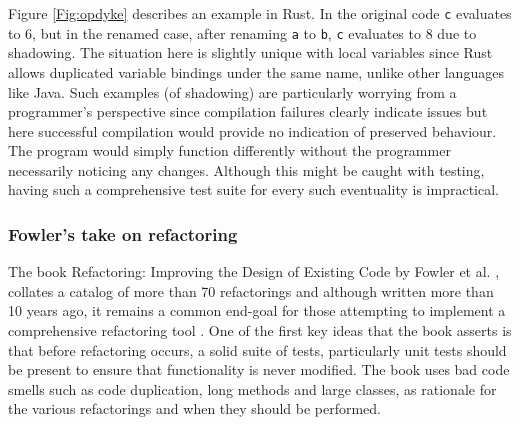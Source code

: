 \label{fig:listings}

Figure \ref{Fig:opdyke} describes an example in Rust. In the original code {\verb|c|} evaluates to 6, but in the renamed case, after renaming {\verb|a|} to {\verb|b|}, {\verb|c|} evaluates to 8 due to shadowing. The situation here is slightly unique with local variables since Rust allows duplicated variable bindings under the same name, unlike other languages like Java. Such examples (of shadowing) are particularly worrying from a programmer's perspective since compilation failures clearly indicate issues but here successful compilation would provide no indication of preserved behaviour. The program would simply function differently without the programmer necessarily noticing any changes. Although this might be caught with testing, having such a comprehensive test suite for every such eventuality is impractical.

\subsubsection{Fowler's take on refactoring}
The book Refactoring: Improving the Design of Existing Code by Fowler et al. \cite{fowler99}, collates a catalog of more than 70 refactorings and although written more than 10 years ago, it remains a common end-goal for those attempting to implement a comprehensive refactoring tool \cite{jetbrains15}. One of the first key ideas that the book asserts is that before refactoring occurs, a solid suite of tests, particularly unit tests should be present to ensure that functionality is never modified. The book uses bad code smells such as code duplication, long methods and large classes, as rationale for the various refactorings and when they should be performed. 


